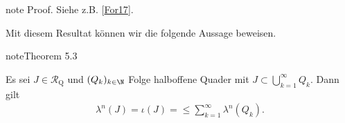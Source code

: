 \documentclass[letterpaper,10pt,german]{jupyterBook}
\begin{document}
\begin{sphinxadmonition}{note}
\sphinxAtStartPar
Proof. Siehe z.B. {[}\hyperlink{cite.references:id4}{For17}{]}.
\end{sphinxadmonition}

\sphinxAtStartPar
Mit diesem Resultat können wir die folgende Aussage beweisen.
\label{masstheorie/masstheorie:thm:lebesgue}
\begin{sphinxadmonition}{note}{Theorem 5.3}



\sphinxAtStartPar
Es sei \(J\in\mathcal{R}_{\text{Q}}\) und \((Q_k)_{k\in\N}\) Folge halboffene Quader mit \(J \subset \bigcup_{k=1}^\infty Q_k\).
Dann gilt
\begin{equation*}
\begin{split}\lambda^n(J) = \iota(J) = \leq \sum_{k=1}^\infty \lambda^n(Q_k).\end{split}
\end{equation*}\end{sphinxadmonition}
\end{document}
